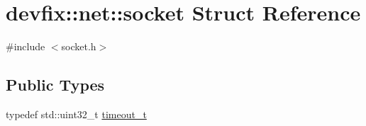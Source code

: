 \hypertarget{structdevfix_1_1net_1_1socket}{}\section{devfix\+:\+:net\+:\+:socket Struct Reference}
\label{structdevfix_1_1net_1_1socket}


{\ttfamily \#include $<$socket.\+h$>$}

\subsection*{Public Types}
\begin{DoxyCompactItemize}
\item 
typedef std\+::uint32\+\_\+t \hyperlink{structdevfix_1_1net_1_1socket_a80a3bf4cb7292bae31ea9c6575539c68}{timeout\+\_\+t}
\end{DoxyCompactItemize}
